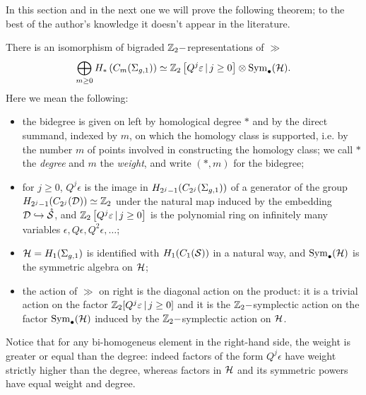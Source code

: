 In this section and in the next one we will prove the following theorem; to the best of the author's knowledge
it doesn't appear in the literature.
\begin{thm}
 \label{thm:Hbms*as*ggrep}
 There is an isomorphism of bigraded $\Z_2-$representations of $\gg$
 \[
  \bigoplus_{m\geq 0} H_*\pa{C_m(\sg)}\simeq \Z_2\left[Q^j\epsilon\,|\, j\geq 0\right]\otimes\Sym_{\bullet}(\H).
 \]
 Here we mean the following:
 \begin{itemize}
  \item the bidegree is given on left by homological degree $*$ and by the direct summand,
  indexed by $m$,
  on which the homology class is supported, i.e. by the number $m$ of points
  involved in constructing the homology class; we call $*$ the \emph{degree} and $m$ the \emph{weight},
  and write $(*,m)$ for the bidegree;
  \item for $j\geq 0$, $Q^j\epsilon$ is the image in $H_{2^j-1}(C_{2^j}(\sg))$ of a generator
  of the group $H_{2^j-1}(C_{2^j}(\D))\simeq \Z_2$ 
  under the natural map induced by the embedding $\D\hookrightarrow\mrS$,
  and $\Z_2\left[Q^j\epsilon\,|\, j\geq 0\right]$ is the polynomial ring on
  infinitely many variables $\epsilon,Q\epsilon,Q^2\epsilon,\dots$;
  \item $\H=H_1(\sg)$ is identified with $H_1(C_1(\S))$ in a natural way, and $\Sym_{\bullet}(\H)$ is the
  symmetric algebra on $\H$;
  \item the action of $\gg$ on right is the diagonal action on the product: it is a trivial action
  on the factor $\Z_2[Q^j\epsilon\,|\, j\geq 0]$ and it is the $\Z_2-$symplectic action on the
  factor $\Sym_{\bullet}(\H)$ induced by the $\Z_2-$symplectic action on $\H$.
  \end{itemize}
\end{thm}
Notice that for any bi-homogeneus element in the right-hand side, the weight is greater or equal than
the degree: indeed factors of the form $Q^j\epsilon$ have weight strictly higher than the degree,
whereas factors in $\H$ and its symmetric powers have equal weight and degree.
  
